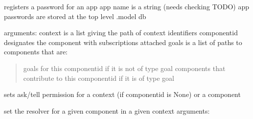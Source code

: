 \documentclass[letterpaper,10pt,english]{sphinxmanual}
\begin{document}
\begin{fulllineitems}
\begin{fulllineitems}
\begin{description}
\end{description}

\end{fulllineitems}


\begin{fulllineitems}
\label{API:personis.client.Access.registerapp}
registers a password for an app
app name is a string (needs checking TODO)
app passwords are stored at the top level .model db

\end{fulllineitems}


\begin{fulllineitems}
\label{API:personis.client.Access.set_goals}
arguments:
context is a list giving the path of context identifiers
componentid designates the component with subscriptions attached
goals is a list of paths to components that are:
\begin{quote}

goals for this componentid if it is not of type goal
components that contribute to this componentid if it is of type goal
\end{quote}

\end{fulllineitems}


\begin{fulllineitems}
\label{API:personis.client.Access.setpermission}
sets ask/tell permission for a context (if componentid is None) or
a component

\end{fulllineitems}


\begin{fulllineitems}
\label{API:personis.client.Access.setresolver}
set the resolver for a given component in a given context
arguments:
\begin{quote}


\end{quote}
\end{fulllineitems}
\end{fulllineitems}
\end{document}
